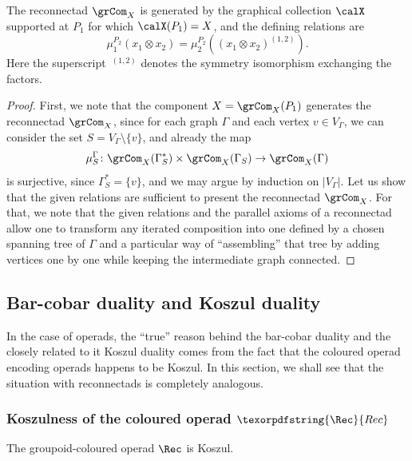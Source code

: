 \begin{prop}\label{prop:relgrcom}
The reconnectad $\grCom_X$ is generated by the graphical collection $\calX$ supported at $P_1$ for which $\calX(P_1)=X$, and the defining relations are 
 \[
\mu^{P_2}_{1}(x_1\otimes x_2)=\mu^{P_2}_{2}((x_1\otimes x_2)^{(1, 2)}).
 \]
Here the superscript~${}^{(1, 2)}$ denotes the symmetry isomorphism exchanging the factors. 
\end{prop}

\begin{proof}
First, we note that the component $X=\grCom_X(P_1)$ generates the reconnectad $\grCom_X$, since for each graph $\Gamma$ and each vertex $v\in V_\Gamma$, we can consider the set $S=V_\Gamma\setminus\{v\}$, and already the map 
 \[
\mu^\Gamma_S\colon \grCom_X(\Gamma^*_S)\times\grCom_X(\Gamma_S)\to\grCom_X(\Gamma) 
 \]
is surjective, since $\Gamma^*_S=\{v\}$, and we may argue by induction on $|V_\Gamma|$. Let us show that the given relations are sufficient to present the reconnectad $\grCom_X$. For that, we note that the given relations and the parallel axioms of a reconnectad allow one to transform any iterated composition into one defined by a chosen spanning tree of $\Gamma$ and a particular way of ``assembling'' that tree by adding vertices one by one while keeping the intermediate graph connected.
\end{proof}

\subsection{Bar-cobar duality and Koszul duality}\label{sec:dualities}

In the case of operads, the ``true'' reason behind the bar-cobar duality and the closely related to it Koszul duality comes from the fact that the coloured operad encoding operads happens to be Koszul. In this section, we shall see that the situation with reconnectads is completely analogous. 

\subsubsection{Koszulness of the coloured operad $\texorpdfstring{\Rec}{Rec}$}

\begin{prop}
The groupoid-coloured operad $\Rec$ is Koszul. 
\end{prop}


